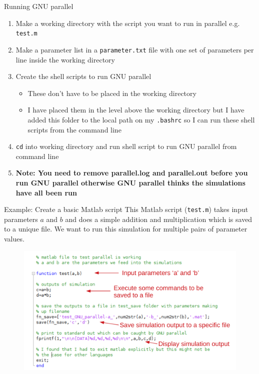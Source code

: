 \documentclass{beamer}
\begin{document}
\begin{frame}{Running GNU parallel}
\begin{enumerate}
\item Make a working directory with the script you want to run in parallel e.g. \texttt{test.m}
\item Make a parameter list in a \texttt{parameter.txt} file with one set of parameters per line inside the working directory
\item Create the shell scripts to run GNU parallel
\begin{itemize}
\item These don't have to be placed in the working directory
\item I have placed them in the level above the working directory but I have added this folder to the local path on my \texttt{.bashrc} so I can run these shell scripts from the command line
\end{itemize}
\item \texttt{cd} into working directory and run shell script to run GNU parallel from command line
\item \textbf{Note: You need to remove parallel.log and parallel.out before you run GNU parallel otherwise GNU parallel thinks the simulations have all been run}
\end{enumerate}
\end{frame}

\begin{frame}{Example: Create a basic Matlab script}
This Matlab script (\texttt{test.m}) takes input parameters $a$ and $b$ and does a simple addition and multiplication which is saved to a unique file. We want to run this simulation for multiple pairs of parameter values.
\begin{figure}
\includegraphics[width=.8\linewidth]{figures/matlab_code_annotated.pdf}	
\end{figure}
\end{frame}
\end{document}
